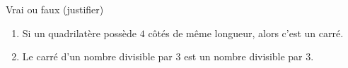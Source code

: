 
\begin{exercice}\label{exosmath-0858}

Vrai ou faux (justifier)
\begin{enumerate}
    \item
        Si un quadrilatère possède $4$ côtés de même longueur, alors c'est un carré.
    \item
        Le carré d'un nombre divisible par \( 3\) est un nombre divisible par \( 3\).
\end{enumerate}


\end{exercice}
